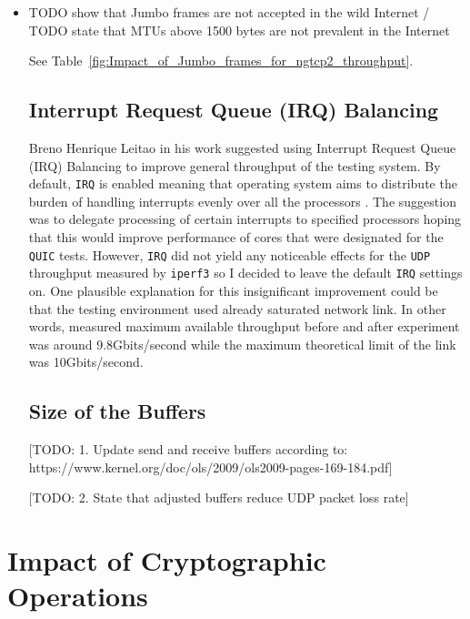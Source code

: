 \documentclass[12pt,a4paper,twoside,openright]{report}
\begin{document}
\begin{itemize}
  
  \item TODO show that Jumbo frames are not accepted in the wild Internet / TODO state that MTUs above 1500 bytes are not prevalent in the Internet
  
  
  See Table~\ref{fig:Impact_of_Jumbo_frames_for_ngtcp2_throughput}.
  
  
\subsection{Interrupt Request Queue (IRQ) Balancing} 
Breno Henrique Leitao in his work suggested using \cite{Tuning_10Gb_network_cards_on_Linux} Interrupt Request Queue (IRQ) Balancing to improve general throughput of the testing system.
By default, \texttt{IRQ} is enabled meaning that operating system aims to distribute the burden of handling interrupts evenly over all the processors \cite{Tuning_10Gb_network_cards_on_Linux}.
The suggestion was to delegate processing of certain interrupts to specified processors hoping that this would improve performance of cores that were designated for the \texttt{QUIC} tests.
However, \texttt{IRQ} did not yield any noticeable effects for the \texttt{UDP} throughput measured by \texttt{iperf3} so I decided to leave the default \texttt{IRQ} settings on.
One plausible explanation for this insignificant improvement could be that the testing environment used already saturated network link.
In other words, measured maximum available throughput before and after experiment was around 9.8Gbits/second while the maximum theoretical limit of the link was 10Gbits/second. 


\subsection{Size of the Buffers} 

[TODO: 1. Update send and receive buffers according to: https://www.kernel.org/doc/ols/2009/ols2009-pages-169-184.pdf]  

[TODO: 2. State that adjusted buffers reduce UDP packet loss rate] 
 
 
  
\end{itemize}






\section{Impact of Cryptographic Operations}
\end{document}
